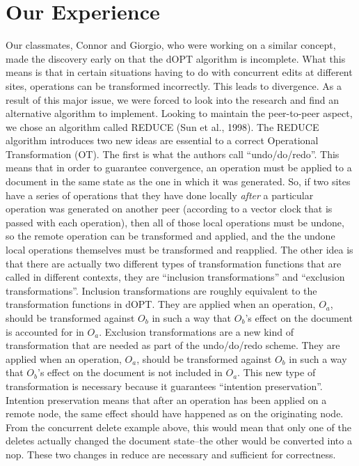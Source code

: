 \documentclass{article}
\begin{document}
\section{Our Experience}
Our classmates, Connor and Giorgio, who were working on a similar concept, made the discovery early on that the dOPT algorithm is incomplete. What this means is that in certain situations having to do with concurrent edits at different sites, operations can be transformed incorrectly. This leads to divergence. As a result of this major issue, we were forced to look into the research and find an alternative algorithm to implement. Looking to maintain the peer-to-peer aspect, we chose an algorithm called REDUCE (Sun et al., 1998). The REDUCE algorithm introduces two new ideas are essential to a correct Operational Transformation (OT). The first is what the authors call ``undo/do/redo''. This means that in order to guarantee convergence, an operation must be applied to a document in the same state as the one in which it was generated. So, if two sites have a series of operations that they have done locally \textit{after} a particular operation was generated on another peer (according to a vector clock that is passed with each operation), then all of those local operations must be undone, so the remote operation can be transformed and applied, and the the undone local operations themselves must be transformed and reapplied. The other idea is that there are actually two different types of transformation functions that are called in different contexts, they are ``inclusion transformations'' and ``exclusion transformations''. Inclusion transformations are roughly equivalent to the transformation functions in dOPT. They are applied when an operation, \(O_a\), should be transformed against \(O_b\) in such a way that \(O_b\)'s effect on the document is accounted for in \(O_a\). Exclusion transformations are a new kind of transformation that are needed as part of the undo/do/redo scheme. They are applied when an operation, \(O_a\), should be transformed against \(O_b\) in such a way that \(O_b\)'s effect on the document is not included in \(O_a\). This new type of transformation is necessary because it guarantees ``intention preservation''. Intention preservation means that after an operation has been applied on a remote node, the same effect should have happened as on the originating node. From the concurrent delete example above, this would mean that only one of the deletes actually changed the document state--the other would be converted into a nop. These two changes in reduce are necessary and sufficient for correctness.\\
\end{document}
